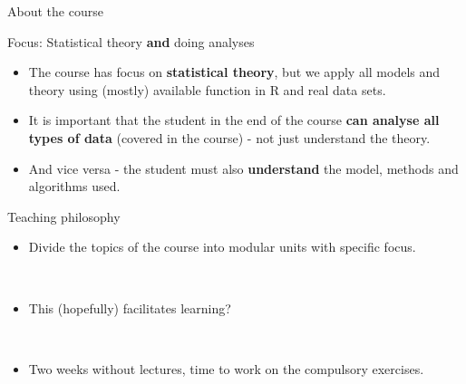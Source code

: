 \documentclass[
  10pt,
  ignorenonframetext,
]{beamer}
\providecommand{\tightlist}{%
  \setlength{\itemsep}{0pt}\setlength{\parskip}{0pt}}
\begin{document}
\begin{frame}{About the course}
\protect\hypertarget{about-the-course}{}
\begin{block}{Focus: Statistical theory \textbf{and} doing analyses}
\protect\hypertarget{focus-statistical-theory-and-doing-analyses}{}
\(~\)

\begin{itemize}
\tightlist
\item
  The course has focus on \textbf{statistical theory}, but we apply all
  models and theory using (mostly) available function in R and real data
  sets.
\end{itemize}

\vspace{2mm}

\begin{itemize}
\tightlist
\item
  It is important that the student in the end of the course \textbf{can
  analyse all types of data} (covered in the course) - not just
  understand the theory.
\end{itemize}

\vspace{2mm}

\begin{itemize}
\tightlist
\item
  And vice versa - the student must also \textbf{understand} the model,
  methods and algorithms used.
\end{itemize}
\end{block}
\end{frame}

\begin{frame}
\begin{block}{Teaching philosophy}
\protect\hypertarget{teaching-philosophy}{}
~

\begin{itemize}
\tightlist
\item
  Divide the topics of the course into modular units with specific
  focus.
\end{itemize}

~

\begin{itemize}
\tightlist
\item
  This (hopefully) facilitates learning?
\end{itemize}

~

\begin{itemize}
\tightlist
\item
  Two weeks without lectures, time to work on the compulsory exercises.
\end{itemize}
\end{block}
\end{frame}
\end{document}
